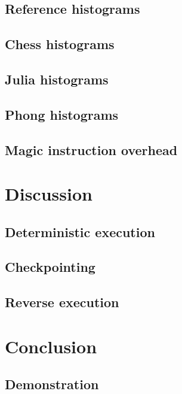 \documentclass{beamer}
\begin{document}
	\subsection{Reference histograms}
	
	\subsection{Chess histograms}
	
	\subsection{Julia histograms}
	
	\subsection{Phong histograms}
	
	\subsection{Magic instruction overhead}
	

	\section{Discussion}
	\subsection{Deterministic execution}
	
	\subsection{Checkpointing}
	
	\subsection{Reverse execution}
	

	\section{Conclusion}
	\subsection{Demonstration}
	
\end{document}
